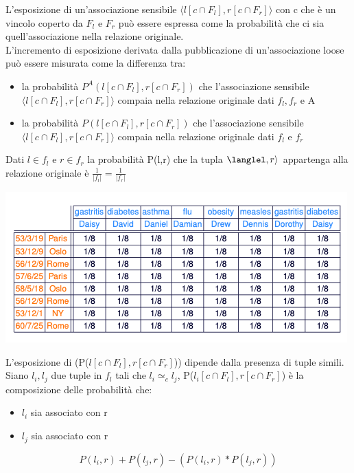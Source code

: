 L'esposizione di un'associazione sensibile \(\langle l[c \cap F_l],r[c \cap F_r] \rangle\) con c che è un vincolo coperto da \(F_l\) e \(F_r\) può essere espressa come la probabilità che ci sia quell'associazione nella relazione originale.\\
L'incremento di esposizione derivata dalla pubblicazione di un'associazione loose può essere misurata come la differenza tra:
\begin{itemize}
    \item la probabilità \(P^A(l[c \cap F_l],r[c \cap F_r])\) che l'associazione sensibile \(\langle l[c \cap F_l],r[c \cap F_r] \rangle\) compaia nella relazione originale dati \(f_l, f_r\) e A
    \item la probabilità \(P(l[c \cap F_l],r[c \cap F_r])\) che l'associazione sensibile \(\langle l[c \cap F_l],r[c \cap F_r] \rangle\) compaia nella relazione originale dati \(f_l\) e \(f_r\)
\end{itemize}
Dati \( l \in f_l\) e \(r \in f_r\) la probabilità P(l,r) che la tupla \(\langlel,r\rangle\) appartenga alla relazione originale è \( \frac{1}{|f_l|} = \frac{1}{|f_r|}\)
\begin{center}
    \includegraphics[scale=0.5]{img/exposure.png}
\end{center}
L'esposizione di (P(\(l[c \cap F_l],r[c \cap F_r]\))) dipende dalla presenza di tuple simili. Siano \(l_i,l_j\) due tuple in \(f_l\) tali che \(l_i \simeq_c l_j\), P(\(l_i[c \cap F_l],r[c \cap F_r]\)) è la composizione delle probabilità che:
\begin{itemize}
    \item \(l_i\) sia associato con r
    \item \(l_j\) sia associato con r
\end{itemize}
\[ P(l_i,r) + P(l_j,r) - (P(l_i,r) * P(l_j,r))\]

